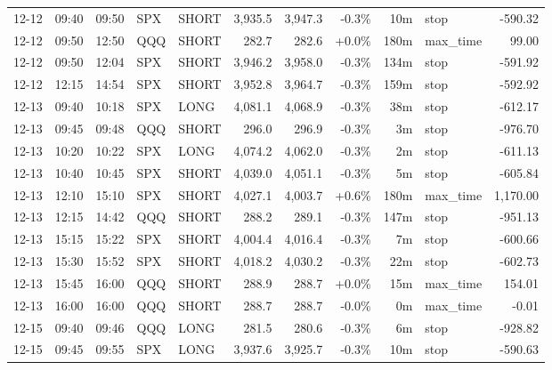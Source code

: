 \documentclass[11pt,a4paper,twoside]{article}
\begin{document}
\begin{center}
\begin{longtable}{>{\color{txtmain}}l l l l l r r r r >{\color{txtmain}}l r}
12-12 & 09:40 & 09:50 & SPX & SHORT & 3,935.5 & 3,947.3 & \textcolor{lossred}{-0.3\%} & 10m & stop & \textcolor{lossred}{-590.32} \\
12-12 & 09:50 & 12:50 & QQQ & SHORT & 282.7 & 282.6 & \textcolor{wingreen}{+0.0\%} & 180m & max\_time & \textcolor{wingreen}{99.00} \\
12-12 & 09:50 & 12:04 & SPX & SHORT & 3,946.2 & 3,958.0 & \textcolor{lossred}{-0.3\%} & 134m & stop & \textcolor{lossred}{-591.92} \\
12-12 & 12:15 & 14:54 & SPX & SHORT & 3,952.8 & 3,964.7 & \textcolor{lossred}{-0.3\%} & 159m & stop & \textcolor{lossred}{-592.92} \\
12-13 & 09:40 & 10:18 & SPX & LONG & 4,081.1 & 4,068.9 & \textcolor{lossred}{-0.3\%} & 38m & stop & \textcolor{lossred}{-612.17} \\
12-13 & 09:45 & 09:48 & QQQ & SHORT & 296.0 & 296.9 & \textcolor{lossred}{-0.3\%} & 3m & stop & \textcolor{lossred}{-976.70} \\
12-13 & 10:20 & 10:22 & SPX & LONG & 4,074.2 & 4,062.0 & \textcolor{lossred}{-0.3\%} & 2m & stop & \textcolor{lossred}{-611.13} \\
12-13 & 10:40 & 10:45 & SPX & SHORT & 4,039.0 & 4,051.1 & \textcolor{lossred}{-0.3\%} & 5m & stop & \textcolor{lossred}{-605.84} \\
12-13 & 12:10 & 15:10 & SPX & SHORT & 4,027.1 & 4,003.7 & \textcolor{wingreen}{+0.6\%} & 180m & max\_time & \textcolor{wingreen}{1,170.00} \\
12-13 & 12:15 & 14:42 & QQQ & SHORT & 288.2 & 289.1 & \textcolor{lossred}{-0.3\%} & 147m & stop & \textcolor{lossred}{-951.13} \\
12-13 & 15:15 & 15:22 & SPX & SHORT & 4,004.4 & 4,016.4 & \textcolor{lossred}{-0.3\%} & 7m & stop & \textcolor{lossred}{-600.66} \\
12-13 & 15:30 & 15:52 & SPX & SHORT & 4,018.2 & 4,030.2 & \textcolor{lossred}{-0.3\%} & 22m & stop & \textcolor{lossred}{-602.73} \\
12-13 & 15:45 & 16:00 & QQQ & SHORT & 288.9 & 288.7 & \textcolor{wingreen}{+0.0\%} & 15m & max\_time & \textcolor{wingreen}{154.01} \\
12-13 & 16:00 & 16:00 & QQQ & SHORT & 288.7 & 288.7 & \textcolor{lossred}{-0.0\%} & 0m & max\_time & \textcolor{lossred}{-0.01} \\
12-15 & 09:40 & 09:46 & QQQ & LONG & 281.5 & 280.6 & \textcolor{lossred}{-0.3\%} & 6m & stop & \textcolor{lossred}{-928.82} \\
12-15 & 09:45 & 09:55 & SPX & LONG & 3,937.6 & 3,925.7 & \textcolor{lossred}{-0.3\%} & 10m & stop & \textcolor{lossred}{-590.63} \\

\end{longtable}
\end{center}
\end{document}
